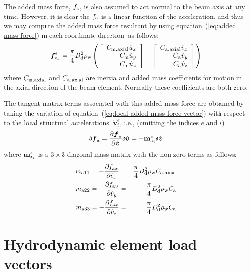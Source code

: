 The added mass force, $f_{\rm a}$, is also assumed to act normal to the beam
axis at any time.
However, it is clear the $f_{\rm a}$ is a linear function of the acceleration,
and thus we may compute the added mass force resultant by using
equation~(\ref{eq:added mass force}) in each coordinate direction, as follows:
%
\begin{equation}
\label{eq:local added mass force vector}
\mbox{\boldmath $f$}_{{\rm a}_i}^e = \frac{\pi}{4}D_{\rm d}^2\rho_{\rm w} \left(\left[\begin{array}{r}
C_{\rm m,axial}\dot{u}_x \\ C_{\rm m}\dot{u}_y \\ C_{\rm m}\dot{u}_z
\end{array}\right] - \left[\begin{array}{r}
C_{\rm a,axial}\dot{v}_x \\ C_{\rm a}\dot{v}_y \\ C_{\rm a}\dot{v}_z
\end{array}\right]\right)
\end{equation}
%
where $C_{\rm m,axial}$ and $C_{\rm a,axial}$ are inertia and added mass coefficients for motion in
the axial direction of the beam element.
Normally these coefficients are both zero.

The tangent matrix terms associated with this added mass force are obtained by
taking the variation of equation~(\ref{eq:local added mass force vector}) with
respect to the local structural accelerations, $\dot{\bm{v}}_i^e$, i.e.,
(omitting the indices $e$ and $i$)
%
\begin{equation}
\delta\mbox{\boldmath $f$}_{\rm a} =
\frac{\partial\mbox{\boldmath $f$}_{\rm a}}{\partial\dot{\mbox{\boldmath $v$}}} \delta\dot{\mbox{\boldmath $v$}} =
-{\bf m}_{{\rm a}_i}^e \delta\dot{\mbox{\boldmath $v$}}
\end{equation}
%
where ${\bf m}_{{\rm a}_i}^e$ is a $3\times3$ diagonal mass matrix with the
non-zero terms as follows:
%
\begin{eqnarray}
m_{{\rm a}11} = -\frac{\partial f_{{\rm a}x}}{\partial\dot{v}_x} &=&
\frac{\pi}{4}\Dd^2\rhow\Caa \\
%
m_{{\rm a}22} = -\frac{\partial f_{{\rm a}y}}{\partial\dot{v}_y} &=&
\frac{\pi}{4}\Dd^2\rhow\Ca \\
%
m_{{\rm a}33} = -\frac{\partial f_{{\rm a}z}}{\partial\dot{v}_z} &=&
\frac{\pi}{4}\Dd^2\rhow\Ca
\end{eqnarray}

\section{Hydrodynamic element load vectors}

